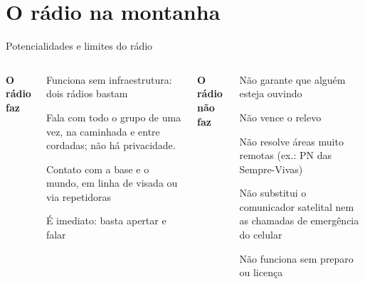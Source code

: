 
\section{O rádio na montanha}

\begin{frame}{Potencialidades e limites do rádio}
  \small
  \begin{columns}[T,onlytextwidth]
      \textbf{\textcolor{cerjGreenDark}{O rádio faz}}
      \begin{certos}
      \item Funciona \alert<1>{sem infraestrutura}: dois rádios bastam
      \item Fala com \alert<2>{todo o grupo de uma vez}, na caminhada e entre cordadas; \alert<3>{não há privacidade}.
      \item Contato com a base e o mundo, em linha de visada ou via repetidoras
      \item É imediato: basta apertar e falar
      \end{certos}
      \textbf{\textcolor{cerjRed}{O rádio não faz}}
      \begin{errados}
      \item Não garante que \alert<4>{alguém esteja ouvindo}
      \item Não vence o relevo
      \item Não resolve áreas muito remotas (ex.: PN das Sempre-Vivas)
      \item Não substitui o \alert<5>{comunicador satelital} nem as chamadas de \alert<6>{emergência do celular}
      \item Não funciona sem \alert<7>{preparo} ou licença
      \end{errados}
  \end{columns}
\end{frame}

